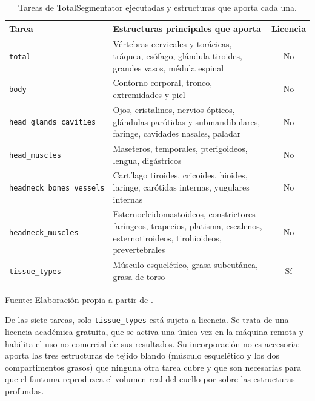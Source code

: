 \begin{table}[H]
  \centering
  \caption{Tareas de TotalSegmentator ejecutadas y estructuras que aporta cada una.}
  \vspace{5pt}
  \label{tab:tasks}
  \begin{tabular}{p{3.4cm}p{7.2cm}c}
    \hline
    \textbf{Tarea} & \textbf{Estructuras principales que aporta} & \textbf{Licencia} \\
    \hline
    \texttt{total} & Vértebras cervicales y torácicas, tráquea, esófago, glándula tiroides, grandes vasos, médula espinal & No \\
    \texttt{body} & Contorno corporal, tronco, extremidades y piel & No \\
    \texttt{head\_glands\_\-cavities} & Ojos, cristalinos, nervios ópticos, glándulas parótidas y submandibulares, faringe, cavidades nasales, paladar & No \\
    \texttt{head\_muscles} & Maseteros, temporales, pterigoideos, lengua, digástricos & No \\
    \texttt{headneck\_bones\_\-vessels} & Cartílago tiroides, cricoides, hioides, laringe, carótidas internas, yugulares internas & No \\
    \texttt{headneck\_muscles} & Esternocleidomastoideos, constrictores faríngeos, trapecios, platisma, escalenos, esternotiroideos, tirohioideos, prevertebrales & No \\
    \texttt{tissue\_types} & Músculo esquelético, grasa subcutánea, grasa de torso & Sí \\
    \hline
  \end{tabular}
  \begin{minipage}{\textwidth}
    \centering
    \vspace{5pt}
    \normalsize Fuente: Elaboración propia a partir de \citet{wasserthal2023totalsegmentator}.\\
  \end{minipage}
\end{table}

De las siete tareas, solo \texttt{tissue\_types} está sujeta a licencia. Se trata de una licencia académica gratuita, que se activa una única vez en la máquina remota y habilita el uso no comercial de sus resultados. Su incorporación no es accesoria: aporta las tres estructuras de tejido blando (músculo esquelético y los dos compartimentos grasos) que ninguna otra tarea cubre y que son necesarias para que el fantoma reproduzca el volumen real del cuello por sobre las estructuras profundas.\\


